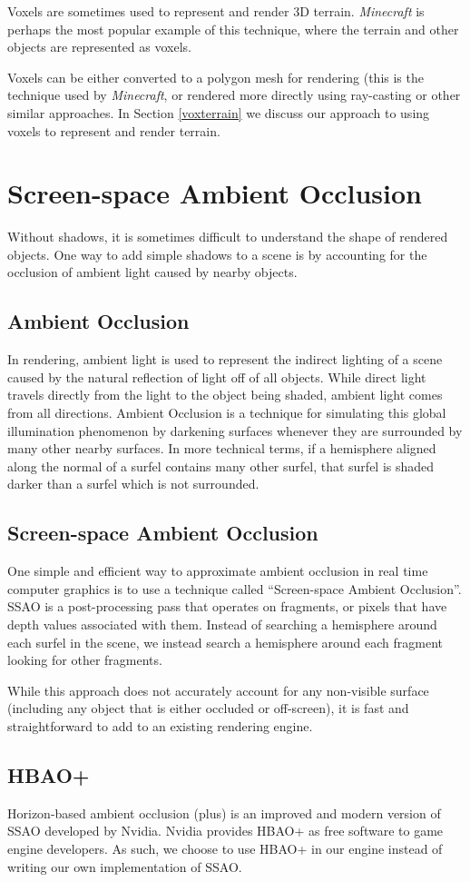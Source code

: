 Voxels are sometimes used to represent and render 3D terrain.
{\em Minecraft} is perhaps the most popular example of this technique, where the terrain and other objects are represented as voxels.

Voxels can be either converted to a polygon mesh for rendering (this is the technique used by {\em Minecraft}, or rendered more directly using ray-casting or other similar approaches.
In Section \ref{voxterrain} we discuss our approach to using voxels to represent and render terrain.


\section{Screen-space Ambient Occlusion} \label{ssao}

Without shadows, it is sometimes difficult to understand the shape of rendered objects.
One way to add simple shadows to a scene is by accounting for the occlusion of ambient light caused by nearby objects.


\subsection{Ambient Occlusion}

In rendering, ambient light is used to represent the indirect lighting of a scene caused by the natural reflection of light off of all objects.
While direct light travels directly from the light to the object being shaded, ambient light comes from all directions.
Ambient Occlusion is a technique for simulating this global illumination phenomenon by darkening surfaces whenever they are surrounded by many other nearby surfaces.
In more technical terms, if a hemisphere aligned along the normal of a surfel contains many other surfel, that surfel is shaded darker than a surfel which is not surrounded.

\subsection{Screen-space Ambient Occlusion}

One simple and efficient way to approximate ambient occlusion in real time computer graphics is to use a technique called ``Screen-space Ambient Occlusion''.
SSAO is a post-processing pass that operates on fragments, or pixels that have depth values associated with them.
Instead of searching a hemisphere around each surfel in the scene, we instead search a hemisphere around each fragment looking for other fragments.

While this approach does not accurately account for any non-visible surface (including any object that is either occluded or off-screen), it is fast and straightforward to add to an existing rendering engine.


\subsection{HBAO+}

Horizon-based ambient occlusion (plus) is an improved and modern version of SSAO developed by Nvidia.
Nvidia provides HBAO+ as free software to game engine developers.
As such, we choose to use HBAO+ in our engine instead of writing our own implementation of SSAO.

